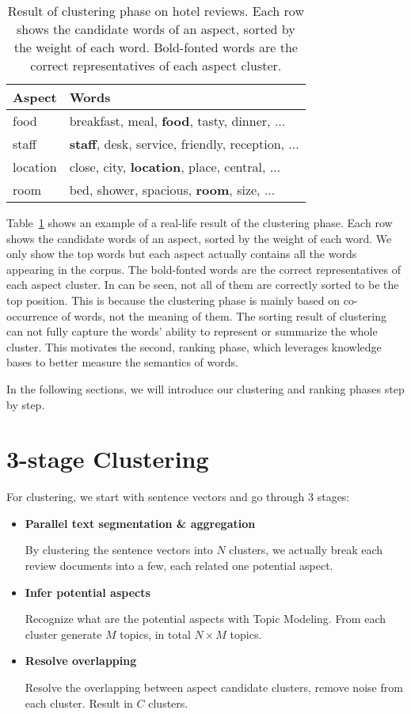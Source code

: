 \begin{table}[t]
\centering
\begin{tabular}{|l|l|} \hline
Aspect & Words \\
\hline 
food & breakfast, meal, \textbf{food}, tasty, dinner, ... \\
\hline
staff & \textbf{staff}, desk, service, friendly, reception, ... \\
\hline
location & close, city, \textbf{location}, place, central, ... \\
\hline
room & bed, shower, spacious, \textbf{room}, size, ... \\
\hline
\end{tabular}
\caption{Result of clustering phase on hotel reviews. 
  Each row shows the candidate words of an aspect, sorted by the weight of each word. 
Bold-fonted words are the correct representatives of each aspect cluster.}
\label{table:cluster_example}
\end{table}

Table~\ref{table:cluster_example} shows an example of a real-life result of the clustering phase. Each row shows the candidate words of an aspect, sorted by the weight of each word. We only show the top words but each aspect actually contains all the words appearing in the corpus. The bold-fonted words are the correct representatives of each aspect cluster. In can be seen, not all of them are correctly sorted to be the top position. This is because the clustering phase is mainly based on co-occurrence of words, not the meaning of them. The sorting result of clustering can not fully capture the words' ability to represent or summarize the whole cluster. This motivates the second, ranking phase, which leverages knowledge bases to better measure the semantics of words.

In the following sections, we will introduce our clustering and ranking phases step by step.

\section{3-stage Clustering}

For clustering, we start with sentence vectors and go through 3 stages:

\begin{itemize}
	\item[1.] \textbf{Parallel text segmentation \& aggregation}

		By clustering the sentence vectors into $N$ clusters, we actually break each review documents into a few, each related one potential aspect.

	\item[2.] \textbf{Infer potential aspects}

		Recognize what are the potential aspects with Topic Modeling. From each cluster generate $M$ topics, in total $N\times M$ topics.

	\item[3.] \textbf{Resolve overlapping}

		Resolve the overlapping between aspect candidate clusters, remove noise from each cluster. Result in $C$ clusters.
\end{itemize}

